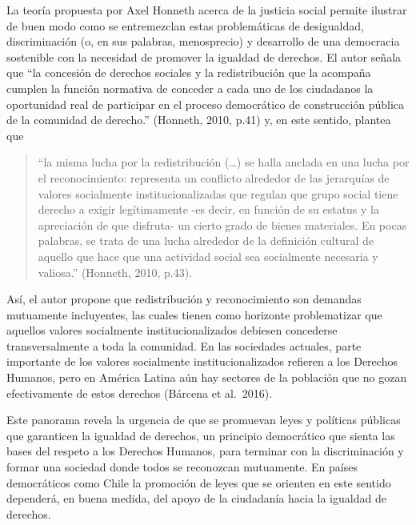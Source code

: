 \documentclass[12pt,twoside]{templates/facsothesis}
\begin{document}
La teoría propuesta por Axel Honneth acerca de la justicia social permite ilustrar de buen modo como se entremezclan estas problemáticas de desigualdad, discriminación (o, en sus palabras, menosprecio) y desarrollo de una democracia sostenible con la necesidad de promover la igualdad de derechos. El autor señala que ``la concesión de derechos sociales y la redistribución que la acompaña cumplen la función normativa de conceder a cada uno de los ciudadanos la oportunidad real de participar en el proceso democrático de construcción pública de la comunidad de derecho.'' (Honneth, 2010, p.41) y, en este sentido, plantea que

\begin{quote}
``la misma lucha por la redistribución (\ldots) se halla anclada en una lucha por el reconocimiento: representa un conflicto alrededor de las jerarquías de valores socialmente institucionalizadas que regulan que grupo social tiene derecho a exigir legítimamente -es decir, en función de su estatus y la apreciación de que disfruta- un cierto grado de bienes materiales. En pocas palabras, se trata de una lucha alrededor de la definición cultural de aquello que hace que una actividad social sea socialmente necesaria y valiosa.'' (Honneth, 2010, p.43).
\end{quote}

Así, el autor propone que redistribución y reconocimiento son demandas mutuamente incluyentes, las cuales tienen como horizonte problematizar que aquellos valores socialmente institucionalizados debiesen concederse transversalmente a toda la comunidad. En las sociedades actuales, parte importante de los valores socialmente institucionalizados refieren a los Derechos Humanos, pero en América Latina aún hay sectores de la población que no gozan efectivamente de estos derechos (Bárcena et al.~2016).

Este panorama revela la urgencia de que se promuevan leyes y políticas públicas que garanticen la igualdad de derechos, un principio democrático que sienta las bases del respeto a los Derechos Humanos, para terminar con la discriminación y formar una sociedad donde todos se reconozcan mutuamente. En países democráticos como Chile la promoción de leyes que se orienten en este sentido dependerá, en buena medida, del apoyo de la ciudadanía hacia la igualdad de derechos.
\end{document}
